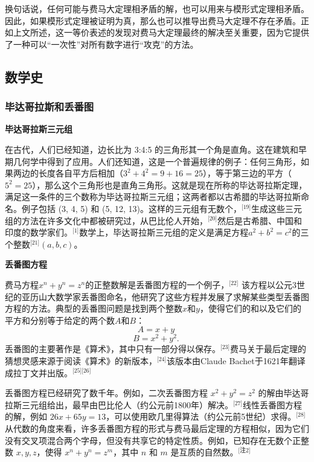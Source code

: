 换句话说，任何可能与费马大定理相矛盾的解，也可以用来与模形式定理相矛盾。因此，如果模形式定理被证明为真，那么也可以推导出费马大定理不存在矛盾。正如上文所述，这一等价表述的发现对费马大定理最终的解决至关重要，因为它提供了一种可以“一次性”对所有数字进行“攻克”的方法。
\subsection{数学史}  
\subsubsection{毕达哥拉斯和丢番图}  
\textbf{毕达哥拉斯三元组 } 

在古代，人们已经知道，边长比为 3:4:5 的三角形其一个角是直角。这在建筑和早期几何学中得到了应用。人们还知道，这是一个普遍规律的例子：任何三角形，如果两边的长度各自平方后相加（\( 3^2 + 4^2 = 9 + 16 = 25 \)），等于第三边的平方（\( 5^2 = 25 \)），那么这个三角形也是直角三角形。这就是现在所称的毕达哥拉斯定理，满足这一条件的三个数称为毕达哥拉斯三元组；这两者都以古希腊的毕达哥拉斯命名。例子包括 (3, 4, 5) 和 (5, 12, 13)。这样的三元组有无数个，\(^\text{[19]}\)生成这些三元组的方法在许多文化中都被研究过，从巴比伦人开始，\(^\text{[20]}\)然后是古希腊、中国和印度的数学家们。\(^\text{[1]}\)数学上，毕达哥拉斯三元组的定义是满足方程\( a^2 + b^2 = c^2 \)的三个整数\(^\text{[21]}\)\((a,b,c)\)。

\textbf{丢番图方程}  

费马方程\( x^n + y^n = z^n \)的正整数解是丢番图方程的一个例子，\(^\text{[22]}\) 该方程以公元3世纪的亚历山大数学家丢番图命名，他研究了这些方程并发展了求解某些类型丢番图方程的方法。典型的丢番图问题是找到两个整数\( x \)和\( y \)，使得它们的和以及它们的平方和分别等于给定的两个数\( A \)和\( B \)：
\[
A = x + y~
\]
\[
B = x^2 + y^2.~
\]
丢番图的主要著作是《算术》，其中只有一部分得以保存。\(^\text{[23]}\)费马关于最后定理的猜想灵感来源于阅读《算术》的新版本，\(^\text{[24]}\)该版本由Claude Bachet于1621年翻译成拉丁文并出版。\(^\text{[25][26]
}\)

丢番图方程已经研究了数千年。例如，二次丢番图方程 \( x^2 + y^2 = z^2 \) 的解由毕达哥拉斯三元组给出，最早由巴比伦人（约公元前1800年）解决。\(^\text{[27]}\)线性丢番图方程的解，例如 \( 26x + 65y = 13 \)，可以使用欧几里得算法（约公元前5世纪）求得。\(^\text{[28]}\)从代数的角度来看，许多丢番图方程的形式与费马最后定理的方程相似，因为它们没有交叉项混合两个字母，但没有共享它的特定性质。例如，已知存在无数个正整数 \( x, y, z \)，使得 \( x^n + y^n = z^m \)，其中 \( n \) 和 \( m \) 是互质的自然数。\(^\text{[注2]}\)
